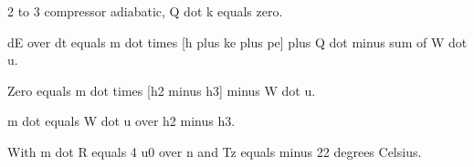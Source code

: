 2 to 3 compressor adiabatic, Q dot k equals zero.

dE over dt equals m dot times [h plus ke plus pe] plus Q dot minus sum of W dot u.

Zero equals m dot times [h2 minus h3] minus W dot u.

m dot equals W dot u over h2 minus h3.

With m dot R equals 4 u0 over n and Tz equals minus 22 degrees Celsius.